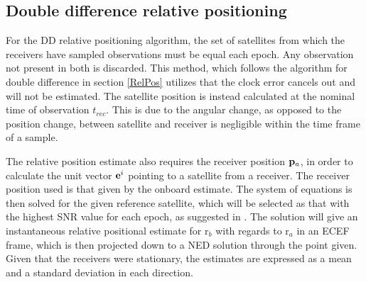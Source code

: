 \subsection{Double difference relative positioning}
For the DD relative positioning algorithm, the set of satellites from which the receivers have sampled observations must be equal each epoch. Any observation not present in both is discarded. 
This method, which follows the algorithm for double difference in section \ref{RelPos} utilizes that the clock error cancels out and will not be estimated. The satellite position is instead calculated at the nominal time of observation $t_{rec}$. This is due to the angular change, as opposed to the position change, between satellite and receiver is negligible within the time frame of a sample. 
\par
The relative position estimate also requires the receiver position ${\bf p}_a$, in order to calculate the unit vector ${\bf e}^i$ pointing to a satellite from a receiver. The receiver position used is that given by the onboard estimate. The system of equations is then solved for the given reference satellite, which will be selected as that with the highest SNR value for each epoch, as suggested in \cite{BLUE}. The solution will give an instantaneous relative positional estimate for r$_b$ with regards to r$_a$ in an ECEF frame, which is then projected down to a NED solution through the point given. Given that the receivers were stationary, the estimates are expressed as a mean and a standard deviation in each direction.


